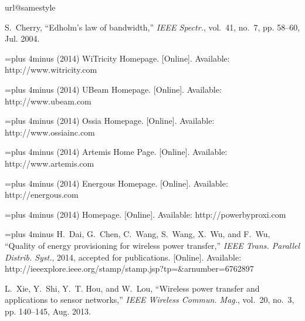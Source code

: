 \documentclass[11pt,draftclsnofoot,journal,onecolumn]{IEEEtran}
\begin{document}
\begin{thebibliography}{10}
\providecommand{\url}[1]{#1}
\csname url@samestyle\endcsname
\providecommand{\newblock}{\relax}
\providecommand{\bibinfo}[2]{#2}
\providecommand{\BIBentrySTDinterwordspacing}{\spaceskip=0pt\relax}
\providecommand{\BIBentryALTinterwordstretchfactor}{4}
\providecommand{\BIBentryALTinterwordspacing}{\spaceskip=\fontdimen2\font plus
\BIBentryALTinterwordstretchfactor\fontdimen3\font minus
  \fontdimen4\font\relax}
\providecommand{\BIBforeignlanguage}[2]{{\expandafter\ifx\csname l@#1\endcsname\relax
\else
\language=\csname l@#1\endcsname
\fi
#2}}
\providecommand{\BIBdecl}{\relax}
\BIBdecl

S.~{Cherry}, ``Edholm's law of bandwidth,'' \emph{{IEEE} Spectr.}, vol.~41,
  no.~7, pp. 58--60, Jul. 2004.

\BIBentryALTinterwordspacing
(2014) WiTricity Homepage. [Online]. Available: \url{http://www.witricity.com}
\BIBentrySTDinterwordspacing

\BIBentryALTinterwordspacing
(2014) UBeam Homepage. [Online]. Available: \url{http://www.ubeam.com}
\BIBentrySTDinterwordspacing

\BIBentryALTinterwordspacing
(2014) Ossia Homepage. [Online]. Available: \url{http://www.ossiainc.com}
\BIBentrySTDinterwordspacing

\BIBentryALTinterwordspacing
(2014) Artemis Home Page. [Online]. Available: \url{http://www.artemis.com}
\BIBentrySTDinterwordspacing

\BIBentryALTinterwordspacing
(2014) Energous Homepage. [Online]. Available: \url{http://energous.com}
\BIBentrySTDinterwordspacing

\BIBentryALTinterwordspacing
(2014) Homepage. [Online]. Available: \url{http://powerbyproxi.com}
\BIBentrySTDinterwordspacing

\BIBentryALTinterwordspacing
H.~{Dai}, G.~{Chen}, C.~{Wang}, S.~{Wang}, X.~{Wu}, and F.~{Wu}, ``Quality of
  energy provisioning for wireless power transfer,'' \emph{{IEEE} Trans.
  Parallel Distrib. Syst.}, 2014, accepted for publications. [Online].
  Available:
  \url{http://ieeexplore.ieee.org/stamp/stamp.jsp?tp=&arnumber=6762897}
\BIBentrySTDinterwordspacing

L.~{Xie}, Y.~{Shi}, Y.~T. {Hou}, and W.~{Lou}, ``Wireless power transfer and
  applications to sensor networks,'' \emph{{IEEE} Wireless Commun. Mag.},
  vol.~20, no.~3, pp. 140--145, Aug. 2013.


\end{thebibliography}
\end{document}
